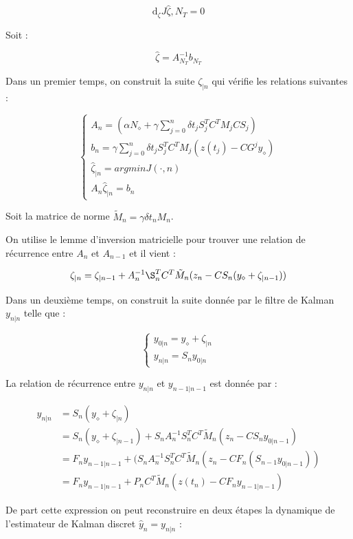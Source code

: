 \documentclass[a4paper]{article}
\begin{document}
\[
\mathrm{d}_{\zeta} J{\hat{\zeta},N_T} = 0
\]

Soit :

\[ \hat{\zeta}= A_{N_T}^{-1} b_{N_T} \]

Dans un premier temps, on construit la suite $\zeta_{|n}$ qui vérifie les relations suivantes :

\begin{equation}
	\begin{cases}
		\displaystyle A_n = (\alpha N_{\diamond} + \gamma  \sum_{j=0}^{n}\delta t_j S_j^TC^TM_jCS_j)\\
		b_n = \gamma \sum_{j=0}^{n} \delta t_j  S_j^T C^T M_j(z(t_j)-CG^jy_{\diamond}) \\
		\hat{\zeta}_{|n} = argmin J(\cdot,n) \\
		A_n \hat{\zeta}_{|n} = b_n
	\end{cases}
\end{equation}


Soit la matrice de norme $\tilde{M}_n= \gamma \delta t_n M_n$.


On utilise le lemme d'inversion matricielle pour trouver une relation de récurrence entre $A_n$ et $A_{n-1}$ et il vient :

\[\zeta_{|n} = \zeta_{|n-1} + A_{n}^{-1} \S_n^T C^T \tilde{M}_n (z_n- C S_n (y_{\diamond} + \zeta_{|n-1}) ) \]

Dans un deuxième temps, on construit la suite donnée par le filtre de Kalman $y_{n|n}$ telle que :

\[
\begin{cases}
	y_{0|n} = y_{\diamond} + \zeta_{|n} \\
	y_{n|n} = S_n y_{0|n} 
\end{cases}
\]

La relation de récurrence entre $y_{n|n}$ et $y_{n-1|n-1}$ est donnée par :

\[
\begin{split}
y_{n|n} &= S_n (y_{\diamond} + \zeta_{|n}) \\
        &= S_n (y_{\diamond} + \zeta_{|n-1}) + S_n A_{n}^{-1}S_n^T C^T \tilde{M}_n (z_n-C S_n y_{0|n-1}) \\
		&= F_n y_{n-1|n-1} + (S_nA_{n}^{-1} S_n^TC^T \tilde{M}_n (z_n -CF_n( S_{n-1} y_{0|n-1})) \\
		&= F_n y_{n-1|n-1} + P_n C^T \tilde{M}_n (z(t_n)-CF_ny_{n-1|n-1})		
\end{split}
\]


De part cette expression on peut reconstruire en deux étapes la dynamique de l'estimateur de Kalman discret $\hat{y}_n = y_{n|n}$ : 
\end{document}
